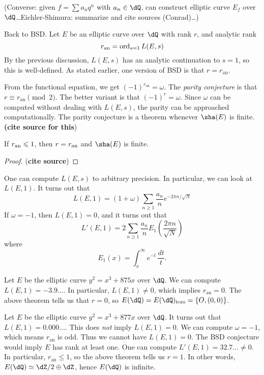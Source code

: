 \documentclass{article}
\begin{document}
(Converse: given $f=\sum a_n q^n$ with $a_n\in \dQ$, can construct elliptic curve 
$E_f$ over $\dQ$\ldots Eichler-Shimura: summarize and cite sources (Conrad)\ldots)

Back to BSD. Let $E$ be an elliptic curve over $\dQ$ with rank $r$, and 
analytic rank 
\[
  r_\text{an} = \operatorname{ord}_{s=1} L(E,s)
\]
By the previous discussion, $L(E,s)$ has an analytic continuation to $s=1$, so 
this is well-defined. As stated earlier, one version of BSD is that 
$r=r_\text{an}$. 

From the functional equation, we get $(-1)^{r_\text{an}}=\omega$. The 
\emph{parity conjecture} is that $r\equiv r_\text{an}\pmod 2$. The better 
variant is that $(-1)^r=\omega$. Since $\omega$ can be computed without 
dealing with $L(E,s)$, the parity can be approached computationally. The parity 
conjecture is a theorem whenever $\sha(E)$ is finite. \textbf{(cite source for 
this})

\begin{theorem}
If $r_\textnormal{an}\leqslant 1$, then $r=r_\textnormal{an}$ and $\sha(E)$ is 
finite. 
\end{theorem}
\begin{proof}
(\textbf{cite source})
\end{proof}

One can compute $L(E,s)$ to arbitrary precision. In particular, we can look at 
$L(E,1)$. It turns out that 
\[
  L(E,1) = (1+\omega) \sum_{n\geqslant 1} \frac{a_n}{n} e^{-2\pi n/\sqrt N}
\]
If $\omega=-1$, then $L(E,1)=0$, and it turns out that 
\[
  L'(E,1) = 2 \sum_{n\geqslant 1} \frac{a_n}{n} E_1(\frac{2\pi n}{\sqrt N})
\]
where 
\[
  E_1(x) = \int_x^\infty e^{-t}\, \frac{dt}{t} \text{.}
\]

\begin{example}
Let $E$ be the elliptic curve $y^2=x^3+875 x$ over $\dQ$. We can compute 
$L(E,1) = -3.9\ldots$. In particular, $L(E,1)\ne 0$, which implies 
$r_\text{an}=0$. The above theorem tells us that $r=0$, so 
$E(\dQ)=E(\dQ)_\text{tors}=\{O,(0,0)\}$. 
\end{example}

\begin{example}
Let $E$ be the elliptic curve $y^2=x^3+877 x$ over $\dQ$. It turns out that 
$L(E,1) = 0.000\ldots$. This does \emph{not} imply $L(E,1) = 0$. We can 
compute $\omega=-1$, which means $r_\text{an}$ is odd. Thus we cannot have 
$L(E,1) = 0$. The BSD conjecture would imply $E$ has rank at least one. One 
can compute $L'(E,1) = 32.7\dots\ne 0$. In particular, 
$r_\text{an}\leqslant 1$, so the above theorem tells us $r=1$. In other words, 
$E(\dQ)\simeq \dZ/2\oplus \dZ$, hence $E(\dQ)$ is infinite. 
\end{example}








\end{document}
